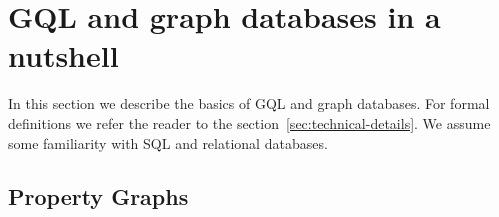 \documentclass[14pt]{constructor-thesis}
\theoremstyle{definition}
\begin{document}






\section{GQL and graph databases in a nutshell}

In this section we describe the basics of GQL and graph databases. For formal definitions we refer the reader to the section~\ref{sec:technical-details}. We assume some familiarity with SQL and relational databases.

\subsection{Property Graphs}
\label{section:intro-property-graphs}
\end{document}
